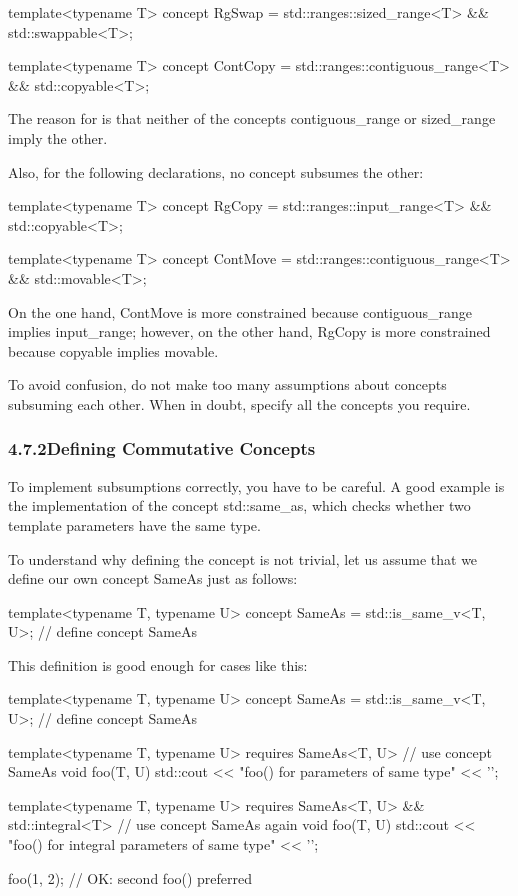 \begin{cpp}
template<typename T>
concept RgSwap = std::ranges::sized_range<T> && std::swappable<T>;

template<typename T>
concept ContCopy = std::ranges::contiguous_range<T> && std::copyable<T>;
\end{cpp}

The reason for is that neither of the concepts contiguous\_range or sized\_range imply the other.

Also, for the following declarations, no concept subsumes the other:

\begin{cpp}
template<typename T>
concept RgCopy = std::ranges::input_range<T> && std::copyable<T>;

template<typename T>
concept ContMove = std::ranges::contiguous_range<T> && std::movable<T>;
\end{cpp}

On the one hand, ContMove is more constrained because contiguous\_range implies input\_range; however, on the other hand, RgCopy is more constrained because copyable implies movable.

To avoid confusion, do not make too many assumptions about concepts subsuming each other. When in doubt, specify all the concepts you require.

\subsubsection*{ 4.7.2\hspace{0.2cm}Defining Commutative Concepts}

To implement subsumptions correctly, you have to be careful. A good example is the implementation of the concept std::same\_as, which checks whether two template parameters have the same type.

To understand why defining the concept is not trivial, let us assume that we define our own concept SameAs just as follows:

\begin{cpp}
template<typename T, typename U>
concept SameAs = std::is_same_v<T, U>; // define concept SameAs
\end{cpp}

This definition is good enough for cases like this:

\begin{cpp}
template<typename T, typename U>
concept SameAs = std::is_same_v<T, U>; // define concept SameAs

template<typename T, typename U>
requires SameAs<T, U> // use concept SameAs
void foo(T, U)
{
	std::cout << "foo() for parameters of same type" << '\n';
}

template<typename T, typename U>
requires SameAs<T, U> && std::integral<T> // use concept SameAs again
void foo(T, U)
{
	std::cout << "foo() for integral parameters of same type" << '\n';
}

foo(1, 2); // OK: second foo() preferred
\end{cpp}

